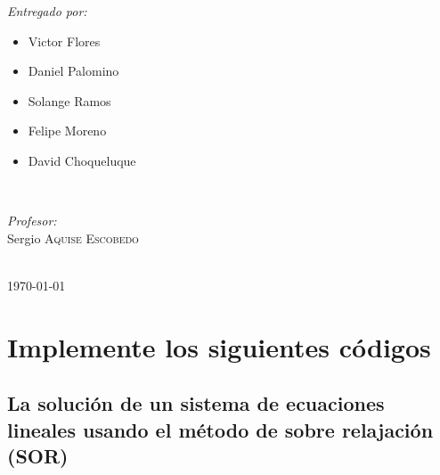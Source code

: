 \documentclass[12pt]{article}
\begin{document}
\begin{titlepage}
\begin{minipage}{0.4\textwidth}
\begin{flushleft} \large
\emph{Entregado por:}\\
\begin{itemize}
    \item Victor Flores
\item  Daniel Palomino
\item Solange Ramos
\item Felipe Moreno
\item David Choqueluque
\end{itemize}
\end{flushleft}
\end{minipage}
~
\begin{minipage}{0.4\textwidth}
\begin{flushright} \large
\emph{Profesor:} \\
Sergio \textsc{Aquise Escobedo} %
\end{flushright}
\end{minipage}\\[2cm]



{\large \today}\\[2cm] %

\vfill %

\end{titlepage}

\newpage

\section{Implemente los siguientes códigos}
\subsection{La solución de un sistema de ecuaciones lineales usando el método de sobre relajación (SOR)}
% 
\end{document}
